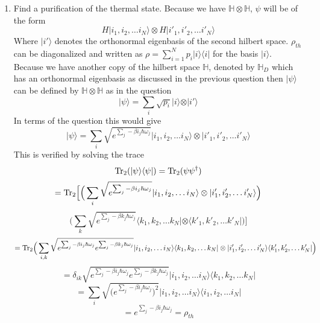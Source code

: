 \documentclass[12pt]{article}
\newcommand{\Tr}{{\rm Tr}}
\newcommand{\ket}[1]{\vert{#1}\rangle}
\newcommand{\bra}[1]{\langle{#1}\vert}
\begin{document}
\begin{enumerate}
    \item Find a purification of the thermal state. Because we have $ \mathbb{H} \otimes \mathbb{H}$, $\psi$ will be of the form 
    $$ H | i_1, i_2, \ldots i_N \rangle \otimes H | i'_1, i'_2, \ldots i'_N \rangle $$
    Where $\ket{i'}$ denotes the orthonormal eigenbasis of the second hilbert space.
    $\rho_{th}$ can be diagonalized and written as $\rho = \sum_{i=1}^N p_i \ket{i} \bra{i} $ for the basis $\ket{i}$. Because we have another copy of the hilbert space $\mathbb{H}$, denoted by $\mathbb{H}_D$ which has an orthonormal eigenbasis as discussed in the previous question then $\ket{\psi} $ can be defined by $\mathbb{H} \otimes \mathbb{H}$ as in the question 
    $$ \ket{\psi} = \sum_i \sqrt{p_i} \ket{i} \otimes \ket{i'} $$
    In terms of the question this would give 
    $$ \ket{\psi} = \sum_i \sqrt{e^{\sum_j - \beta i_j \hbar \omega_j }} | i_1, i_2, \ldots i_N \rangle \otimes |i'_1, i'_2, \ldots i'_N \rangle $$
    This is verified by solving the trace 
    $$ \Tr_2 (\ket{\psi} \bra{\psi} ) = \Tr_2 (\psi \psi^{\dagger}) $$
    $$ = \Tr_2 \Big[ \Big(  \sum_i \sqrt{e^{\sum_j -\beta i_j \hbar \omega_j}} | i_1, i_2, \ldots i_N \rangle \otimes | i'_1, i'_2, \ldots i'_N \rangle  \Big) $$
    $$  \Big( \sum_k \sqrt{e^{\sum_j - \beta k_j \hbar \omega_j }} \langle k_1, k_2, \ldots k_N | \otimes \langle k'_1, k'_2, \ldots k'_N | \Big)\Big] $$
    $$ = \Tr_2 \Big( \sum_{i,k} \sqrt{e^{\sum_j - \beta i_j \hbar \omega_j } e^{\sum_j - \beta k_j \hbar \omega_j}} |i_1, i_2, \ldots i_N \rangle \langle k_1, k_2, \ldots k_N | \otimes | i'_1, i'_2, \ldots i'_N \rangle \langle k'_1, k'_2, \ldots k'_N |  \Big) $$
    $$ = \delta_{ik} \sqrt{e^{\sum_j - \beta i_j \hbar \omega_j } e^{\sum_j - \beta k_j \hbar \omega_j}} |i_1, i_2, \ldots i_N \rangle \langle k_1, k_2, \ldots k_N | $$
    $$ = \sum_i \sqrt{\big( e^{\sum_j - \beta i_j \hbar \omega_j}\big)^2} |i_1, i_2, \ldots i_N \rangle \langle i_1, i_2, \ldots i_N | $$
    $$ = e^{\sum_j - \beta i_j \hbar \omega_j } = \rho_{th} $$

\end{enumerate}
\end{document}
